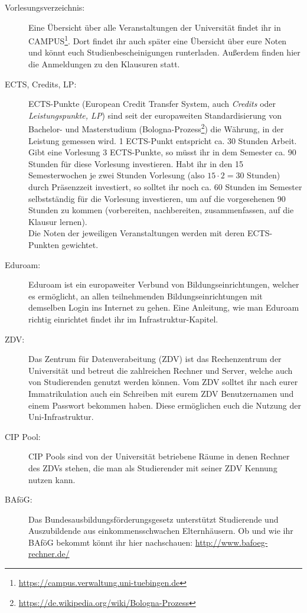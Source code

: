 \begin{description}
\item [Vorlesungsverzeichnis:] Eine Übersicht über alle Veranstaltungen der Universität findet ihr in CAMPUS\footnote{\url{https://campus.verwaltung.uni-tuebingen.de}}. Dort findet ihr auch später eine Übersicht über eure Noten und könnt euch Studienbescheinigungen runterladen. Außerdem finden hier die Anmeldungen zu den Klausuren statt.	%

\item [ECTS, Credits, LP:] ECTS-Punkte (European Credit Transfer System, auch \textit{Credits} oder \textit{Leistungspunkte, LP}) sind seit der europaweiten Standardisierung von Bachelor- und Masterstudium (Bologna-Prozess\footnote{\url{https://de.wikipedia.org/wiki/Bologna-Prozess}}) die Währung, in der Leistung gemessen wird. 1 ECTS-Punkt entspricht ca. 30 Stunden Arbeit. Gibt eine Vorlesung 3 ECTS-Punkte, so müsst ihr in dem Semester ca. 90 Stunden für diese Vorlesung investieren. Habt ihr in den 15 Semesterwochen je zwei Stunden Vorlesung (also $15\cdot 2=30$ Stunden) durch Präsenzzeit investiert, so solltet ihr noch ca. 60 Stunden im Semester selbstständig für die Vorlesung investieren, um auf die vorgesehenen 90 Stunden zu kommen (vorbereiten, nachbereiten, zusammenfassen, auf die Klausur lernen).\\	%
Die Noten der jeweiligen Veranstaltungen werden mit deren ECTS-Punkten gewichtet.
 
\item [Eduroam:] Eduroam ist ein europaweiter Verbund von Bildungseinrichtungen, welcher es ermöglicht, an allen teilnehmenden Bildungseinrichtungen mit demselben Login ins Internet zu gehen.
Eine Anleitung, wie man Eduroam richtig einrichtet findet ihr im Infrastruktur-Kapitel.

\item [ZDV:] Das Zentrum für Datenverabeitung (ZDV) ist das Rechenzentrum der Universität und betreut die zahlreichen Rechner und Server, welche auch von Studierenden genutzt werden können. Vom ZDV solltet ihr nach eurer Immatrikulation auch ein Schreiben mit eurem ZDV Benutzernamen und einem Passwort bekommen haben. Diese ermöglichen euch die Nutzung der Uni-Infrastruktur.

\item [CIP Pool:] CIP Pools sind von der Universität betriebene Räume in denen Rechner des ZDVs stehen, die man als Studierender mit seiner ZDV Kennung nutzen kann.

\item[BAföG:] Das Bundesausbildungsförderungsgesetz unterstützt Studierende und Auszubildende aus einkommensschwachen Elternhäusern. Ob und wie ihr BAföG bekommt könnt ihr hier nachschauen: \url{http://www.bafoeg-rechner.de/}	%


\end{description}
